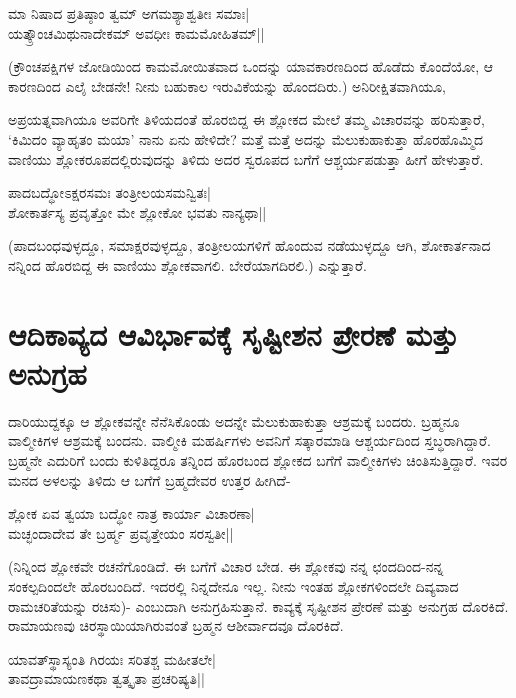 \begin{shloka} 
ಮಾ ನಿಷಾದ ಪ್ರತಿಷ್ಠಾಂ ತ್ವಮ್‍ ಅಗಮಶ್ಯಾಶ್ವತೀಃ ಸಮಾಃ|\\ 
ಯತ್ಕ್ರೌಂಚಮಿಥುನಾದೇಕಮ್‍ ಅವಧೀಃ ಕಾಮಮೋಹಿತಮ್‍||
\end{shloka} 

(ಕ್ರೌಂಚಪಕ್ಷಿಗಳ ಜೋಡಿಯಿಂದ ಕಾಮಮೋಯಿತವಾದ ಒಂದನ್ನು ಯಾವಕಾರಣದಿಂದ ಹೊಡೆದು ಕೊಂದೆಯೋ, ಆ ಕಾರಣದಿಂದ ಎಲೈ ಬೇಡನೇ! ನೀನು ಬಹುಕಾಲ ಇರುವಿಕೆಯನ್ನು ಹೊಂದದಿರು.) ಅನಿರೀಕ್ಷಿತವಾಗಿಯೂ, 

ಅಪ್ರಯತ್ನವಾಗಿಯೂ ಅವರಿಗೇ ತಿಳಿಯದಂತೆ ಹೊರಬಿದ್ದ ಈ ಶ್ಲೋಕದ ಮೇಲೆ ತಮ್ಮ ವಿಚಾರವನ್ನು ಹರಿಸುತ್ತಾರೆ, `ಕಿಮಿದಂ ವ್ಯಾಹೃತಂ ಮಯಾ' ನಾನು ಏನು ಹೇಳಿದೇ? ಮತ್ತೆ ಮತ್ತೆ ಅದನ್ನು ಮೆಲುಕುಹಾಕುತ್ತಾ ಹೊರಹೊಮ್ಮಿದ ವಾಣಿಯು ಶ್ಲೋಕರೂಪದಲ್ಲಿರುವುದನ್ನು ತಿಳಿದು ಅದರ ಸ್ವರೂಪದ ಬಗೆಗೆ ಆಶ್ಚರ್ಯಪಡುತ್ತಾ ಹೀಗೆ ಹೇಳುತ್ತಾರೆ. 

\begin{shloka} 
ಪಾದಬದ್ಧೋಽಕ್ಷರಸಮಃ ತಂತ್ರೀಲಯಸಮನ್ವಿತಃ|\\ 
ಶೋಕಾರ್ತಸ್ಯ ಪ್ರವೃತ್ತೋ ಮೇ ಶ್ಲೋಕೋ ಭವತು ನಾನ್ಯಥಾ||
\end{shloka}

(ಪಾದಬಂಧವುಳ್ಳದ್ದೂ, ಸಮಾಕ್ಷರವುಳ್ಳದ್ದೂ, ತಂತ್ರೀಲಯಗಳಿಗೆ ಹೊಂದುವ ನಡೆಯುಳ್ಳದ್ದೂ ಆಗಿ, ಶೋಕಾರ್ತನಾದ ನನ್ನಿಂದ ಹೊರಬಿದ್ದ ಈ ವಾಣಿಯು ಶ್ಲೋಕವಾಗಲಿ. ಬೇರೆಯಾಗದಿರಲಿ.) ಎನ್ನುತ್ತಾರೆ. 

\section*{ಆದಿಕಾವ್ಯದ ಆವಿರ್ಭಾವಕ್ಕೆ ಸೃಷ್ಟೀಶನ ಪ್ರೇರಣೆ ಮತ್ತು ಅನುಗ್ರಹ} 

ದಾರಿಯುದ್ದಕ್ಕೂ ಆ ಶ್ಲೋಕವನ್ನೇ ನೆನೆಸಿಕೊಂಡು ಅದನ್ನೇ ಮೆಲುಕುಹಾಕುತ್ತಾ ಆಶ್ರಮಕ್ಕೆ ಬಂದರು. ಬ್ರಹ್ಮನೂ ವಾಲ್ಮೀಕಿಗಳ ಆಶ್ರಮಕ್ಕೆ ಬಂದನು. ವಾಲ್ಮೀಕಿ ಮಹರ್ಷಿಗಳು ಅವನಿಗೆ ಸತ್ಕಾರಮಾಡಿ ಆಶ್ಚರ್ಯದಿಂದ ಸ್ತಬ್ಧರಾಗಿದ್ದಾರೆ. ಬ್ರಹ್ಮನೇ ಎದುರಿಗೆ ಬಂದು ಕುಳಿತಿದ್ದರೂ ತನ್ನಿಂದ ಹೊರಬಂದ ಶ್ಲೋಕದ ಬಗೆಗೆ ವಾಲ್ಮೀಕಿಗಳು ಚಿಂತಿಸುತ್ತಿದ್ದಾರೆ. ಇವರ ಮನದ ಅಳಲನ್ನು ತಿಳಿದು ಆ ಬಗೆಗೆ ಬ್ರಹ್ಮದೇವರ ಉತ್ತರ ಹೀಗಿದೆ- 

\begin{shloka} 
ಶ್ಲೋಕ ಏವ ತ್ವಯಾ ಬದ್ಧೋ ನಾತ್ರ ಕಾರ್ಯಾ ವಿಚಾರಣಾ|\\ 
ಮಚ್ಛಂದಾದೇವ ತೇ ಬ್ರರ್ಹ್ಮ ಪ್ರವೃತ್ತೇಯಂ ಸರಸ್ವತೀ||
\end{shloka} 

(ನಿನ್ನಿಂದ ಶ್ಲೋಕವೇ ರಚನೆಗೊಂಡಿದೆ. ಈ ಬಗೆಗೆ ವಿಚಾರ ಬೇಡ. ಈ ಶ್ಲೋಕವು ನನ್ನ ಛಂದದಿಂದ-ನನ್ನ ಸಂಕಲ್ಪದಿಂದಲೇ ಹೊರಬಂದಿದೆ. ಇದರಲ್ಲಿ ನಿನ್ನದೇನೂ ಇಲ್ಲ. ನೀನು ಇಂತಹ ಶ್ಲೋಕಗಳಿಂದಲೇ ದಿವ್ಯವಾದ ರಾಮಚರಿತೆಯನ್ನು ರಚಿಸು)- ಎಂಬುದಾಗಿ ಅನುಗ್ರಹಿಸುತ್ತಾನೆ. ಕಾವ್ಯಕ್ಕೆ ಸೃಷ್ಟೀಶನ ಪ್ರೇರಣೆ ಮತ್ತು ಅನುಗ್ರಹ ದೊರಕಿದೆ. ರಾಮಾಯಣವು ಚಿರಸ್ಥಾಯಿಯಾಗಿರುವಂತೆ ಬ್ರಹ್ಮನ ಆಶೀರ್ವಾದವೂ ದೊರಕಿದೆ. 

\begin{shloka} 
ಯಾವತ್‍ಸ್ಥಾಸ್ಯಂತಿ ಗಿರಯಃ ಸರಿತಶ್ಚ ಮಹೀತಲೇ|\\ 
ತಾವದ್ರಾಮಾಯಣಕಥಾ ತ್ವತ್ಕೃತಾ ಪ್ರಚರಿಷ್ಯತಿ||
\end{shloka} 

